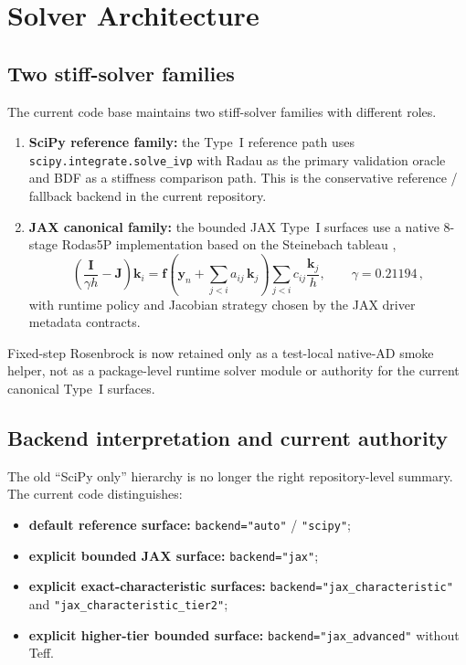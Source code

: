 \section{Solver Architecture}\label{sec:solver}

\subsection{Two stiff-solver families}

The current code base maintains two stiff-solver families with different roles.
\begin{enumerate}
\item \textbf{SciPy reference family:} the Type~I reference path uses \texttt{scipy.integrate.solve\_ivp} with Radau as the primary validation oracle and BDF as a stiffness comparison path.  This is the conservative reference / fallback backend in the current repository.
\item \textbf{JAX canonical family:} the bounded JAX Type~I surfaces use a native 8-stage Rodas5P implementation based on the Steinebach tableau \cite{Steinebach2023},
\begin{equation}
\left(\frac{\mathbf{I}}{\gamma h} - \mathbf{J}\right)\mathbf{k}_i
= \mathbf{f}\!\left(\mathbf{y}_n + \sum_{j<i} a_{ij}\,\mathbf{k}_j\right)
 \sum_{j<i} c_{ij}\frac{\mathbf{k}_j}{h},
\qquad \gamma = 0.21194\,,
\end{equation}
with runtime policy and Jacobian strategy chosen by the JAX driver metadata contracts.
\end{enumerate}

Fixed-step Rosenbrock is now retained only as a test-local native-AD smoke helper, not as a package-level runtime solver module or authority for the current canonical Type~I surfaces.

\subsection{Backend interpretation and current authority}

The old ``SciPy only'' hierarchy is no longer the right repository-level summary.  The current code distinguishes:
\begin{itemize}
\item \textbf{default reference surface:} \texttt{backend="auto"} / \texttt{"scipy"};
\item \textbf{explicit bounded JAX surface:} \texttt{backend="jax"};
\item \textbf{explicit exact-characteristic surfaces:} \texttt{backend="jax\_characteristic"} and \texttt{"jax\_characteristic\_tier2"};
\item \textbf{explicit higher-tier bounded surface:} \texttt{backend="jax\_advanced"} without Teff.
\end{itemize}

